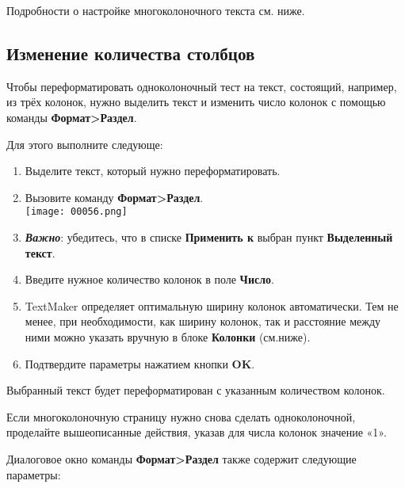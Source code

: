 ﻿\documentclass[a4paper,10pt]{article}
\begin{document}
Подробности о настройке многоколоночного текста см. ниже.

\subsection{Изменение количества столбцов}
Чтобы переформатировать одноколоночный тест на текст, состоящий, например, из трёх колонок, нужно выделить текст и изменить число колонок с помощью команды \textbf{Формат>Раздел}.

Для этого выполните следующе:
\begin{enumerate}
 \item Выделите текст, который нужно переформатировать.
 \item Вызовите команду \textbf{Формат>Раздел}.\\
 \texttt{[image: 00056.png]}
 \item \textbf{\textit{Важно}}: убедитесь, что в списке \textbf{Применить к} выбран пункт \textbf{Выделенный текст}.
 \item Введите нужное количество колонок в поле \textbf{Число}.
 \item TextMaker определяет оптимальную ширину колонок автоматически. Тем не менее, при необходимости, как ширину колонок, так и расстояние между ними можно указать вручную в блоке \textbf{Колонки} (см.ниже).
 \item Подтвердите параметры нажатием кнопки \textbf{OK}.
\end{enumerate}

Выбранный текст будет переформатирован с указанным количеством колонок.

Если многоколоночную страницу нужно снова сделать одноколоночной, проделайте вышеописанные действия, указав для числа колонок значение «1».

Диалоговое окно команды \textbf{Формат>Раздел} также содержит следующие параметры:
\end{document}
